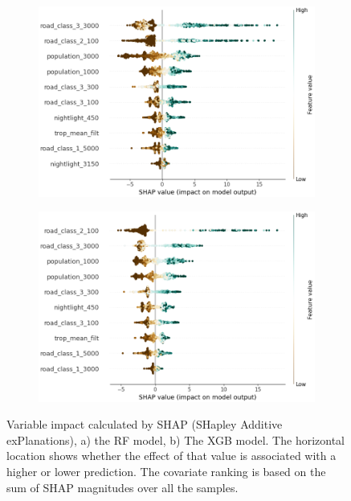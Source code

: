 \documentclass{article}
\begin{document}
\begin{figure}
\begin{subfigure}{.5\textwidth}
  \centering
\includegraphics[scale = 0.3]{fig/rfshap.png}
  \caption{}
  \label{fig:sfig1}
\end{subfigure}%
\begin{subfigure}{.5\textwidth}
  \centering
  \includegraphics[scale = 0.3]{fig/xgbshap.png}
  \caption{}
  \label{fig:sfig2}
\end{subfigure}
\caption{Variable impact calculated by SHAP (SHapley Additive exPlanations), a) the RF model, b) The XGB model. The horizontal location shows whether the effect of that value is associated with a higher or lower prediction. The covariate ranking is based on the sum of SHAP magnitudes over all the samples.}
\label{fig:rfxgbshap}
\end{figure}
  
\end{document}
